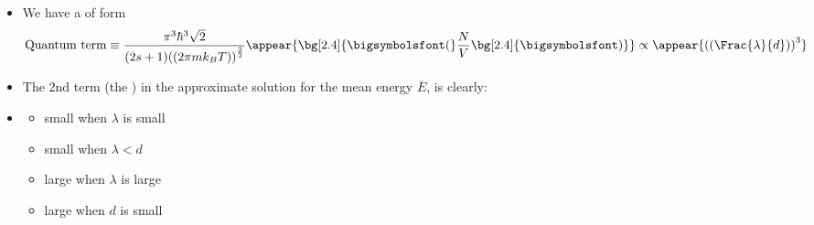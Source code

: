 \begin{frame}
\frametitle{\texorpdfstring{\culine[\sectiontitleulinecolor]{\sectiontitle}}{\sectiontitle} }

\begin{itemize}
	
\item We have a  of form 
\[
\text {Quantum term}  \equiv \frac{\pi^{3} \hbar^{3} \sqrt{2}}{(2 s+1) \textrm{((}2 \pi m k_{B} T \textrm{))}^{\frac{3}{2}}} \appear{ \bg[2.4]{\text{\bigsymbolsfont(}} \frac{N}{V} \bg[2.4]{\text{\bigsymbolsfont)}} } \propto \appear{\textrm{((}\Frac{\lambda}{d} \textrm{))}^{3}}
\]

\item The 2nd term (the ) in the approximate solution for the mean energy $\overline{E}$, is clearly:
\item[] \begin{itemize}[itemsep=3.5mm]
	 \item small when $\lambda$ is small
\item small when $\lambda<d$
\item large when $\lambda$ is large
\item large when $d$ is small
\end{itemize}


\end{itemize}


\endofslide 
\end{frame}

